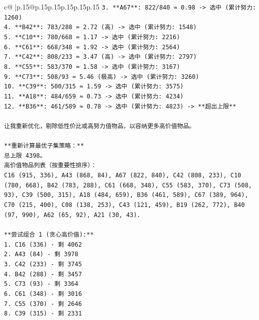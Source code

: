 \documentclass{article}
\begin{document}
{\begin{supertabular}{c@{$\;$}|p{.15\linewidth}@{}p{.15\linewidth}p{.15\linewidth}p{.15\linewidth}p{.15\linewidth}p{.15\linewidth}}
{{{\texttt{3. **A67**: 822/840 ≈ 0.98 {-}> 选中 (累计努力: 1260)} \\
\texttt{4. **B42**: 783/288 ≈ 2.72 (高) {-}> 选中 (累计努力: 1548)} \\
\texttt{5. **C10**: 780/668 ≈ 1.17 {-}> 选中 (累计努力: 2216)} \\
\texttt{6. **C61**: 668/348 ≈ 1.92 {-}> 选中 (累计努力: 2564)} \\
\texttt{7. **C42**: 808/233 ≈ 3.47 (高) {-}> 选中 (累计努力: 2797)} \\
\texttt{8. **C55**: 583/370 ≈ 1.58 {-}> 选中 (累计努力: 3167)} \\
\texttt{9. **C73**: 508/93 ≈ 5.46 (极高) {-}> 选中 (累计努力: 3260)} \\
\texttt{10. **C39**: 500/315 ≈ 1.59 {-}> 选中 (累计努力: 3575)} \\
\texttt{11. **A18**: 484/659 ≈ 0.73 {-}> 选中 (累计努力: 4234)} \\
\texttt{12. **B36**: 461/589 ≈ 0.78 {-}> 选中 (累计努力: 4823) {-}> **超出上限**} \\
\\ 
\texttt{让我重新优化，剔除低性价比或高努力值物品，以容纳更多高价值物品。} \\
\\ 
\texttt{**重新计算最优子集策略：**} \\
\texttt{总上限 4398。} \\
\texttt{高价值物品列表（按重要性排序）：} \\
\texttt{C16 (915, 336), A43 (868, 84), A67 (822, 840), C42 (808, 233), C10 (780, 668), B42 (783, 288), C61 (668, 348), C55 (583, 370), C73 (508, 93), C39 (500, 315), A18 (484, 659), B36 (461, 589), C67 (389, 964), C70 (215, 400), C08 (138, 253), C43 (121, 459), B19 (262, 772), B40 (97, 990), A62 (65, 92), A21 (30, 43).} \\
\\ 
\texttt{**尝试组合 1 (贪心高价值):**} \\
\texttt{1. C16 (336) {-} 剩 4062} \\
\texttt{2. A43 (84) {-} 剩 3978} \\
\texttt{3. C42 (233) {-} 剩 3745} \\
\texttt{4. B42 (288) {-} 剩 3457} \\
\texttt{5. C73 (93) {-} 剩 3364} \\
\texttt{6. C61 (348) {-} 剩 3016} \\
\texttt{7. C55 (370) {-} 剩 2646} \\
\texttt{8. C39 (315) {-} 剩 2331} \\
}}}
\end{supertabular}}
\end{document}
